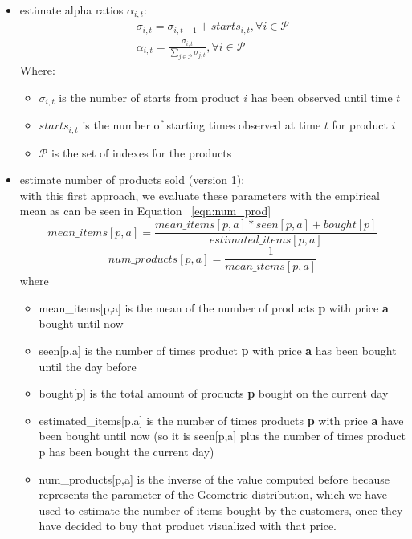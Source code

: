 \begin{itemize}
    \item estimate alpha ratios $\alpha_{i, t}$:
    \begin{align}
        \sigma_{i, t} = \sigma_{i, t - 1} + starts_{i, t}, \forall i \in \mathcal{P}\\
        \alpha_{i, t} = \frac{\sigma_{i, t}}{\sum_{j \in \mathcal{P}}\sigma_{j, t}},  \forall i \in \mathcal{P}
        \label{eqn:alpha}
    \end{align}Where:\begin{itemize}
        \item $\sigma_{i, t}$ is the number of starts from product $i$ has been observed until time $t$
        \item $starts_{i, t}$ is the number of starting times observed at time $t$ for product $i$
        \item $\mathcal{P}$ is the set of indexes for the products
        \end{itemize}
    \item estimate number of products sold (version 1):\\
    with this first approach, we evaluate these parameters with the empirical mean as can be seen in Equation ~\ref{eqn:num_prod} \begin{equation}
        \label{eqn:mean_items}
        mean\_items[p,a] = \frac{mean\_items[p,a] * seen[p,a] + bought[p]}{estimated\_items[p,a]}
    \end{equation}\begin{equation}
        \label{eqn:num_prod}
        num\_products[p,a] = \frac{1}{mean\_items[p,a]}
    \end{equation}where\begin{itemize}
        \item mean\_items[p,a] is the mean of the number of products {\bf p} with price {\bf a} bought until now
        \item seen[p,a] is the number of times product {\bf p} with price {\bf a} has been bought until the day before
        \item bought[p] is the total amount of products {\bf p} bought on the current day
        \item estimated\_items[p,a] is the number of times products {\bf p} with price {\bf a} have been bought until now (so it is seen[p,a] plus the number of times product p has been bought the current day)
        \item num\_products[p,a] is the inverse of the value computed before because represents the parameter of the Geometric distribution, which we have used to estimate the number of items bought by the customers, once they have decided to buy that product visualized with that price.

\end{itemize}
\end{itemize}
